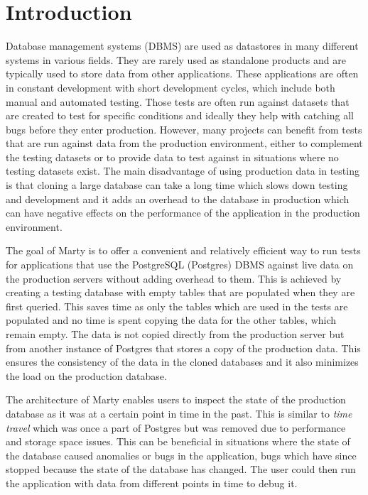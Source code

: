 \chapter{Introduction}
\setcounter{page}{1}
Database management systems (DBMS) are used as datastores in many different systems in various fields.
They are rarely used as standalone products and are typically used to store data from other applications.
These applications are often in constant development with short development cycles, which include both manual and automated testing.
Those  tests are often run against datasets that are created to test for specific conditions and ideally they help with catching all bugs before they enter production. However, many projects can benefit from tests that are run against data from the production environment, either to complement the testing datasets or to provide data to test against in situations where no testing datasets exist.
The main disadvantage of using production data in testing is that cloning a large database can take a long time which slows down testing and development and it adds an overhead to the database in production which can have negative effects on the performance of the application in the production environment.

The goal of Marty is to offer a convenient and relatively efficient way to run tests for applications that use the PostgreSQL (Postgres) DBMS against live data on the production servers without adding overhead to them.
This is achieved by creating a testing database with empty tables that are populated  when they are first queried.
This saves time as only the tables which are used in the tests are populated and no time is spent copying the data for the other tables, which remain empty.
The data is not copied directly from the production server but from another instance of Postgres that stores a copy of the production data.
This ensures the consistency of the data in the cloned databases and it also minimizes the load on the production database.

The architecture of Marty enables users to inspect the state of the production database as it was at a certain point in time in the past.
This is similar to \textit{time travel} which was once a part of Postgres but was removed due to performance and storage space issues.
This can be beneficial in situations where the state of the database caused anomalies or bugs in the application, bugs which have since stopped because the state of the database has changed.
The user could then run the application with data from different points in time to debug it.





